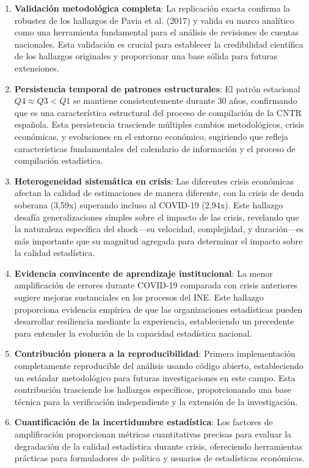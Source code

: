 \documentclass[12pt,a4paper]{article}
\begin{document}
\begin{enumerate}
\item \textbf{Validación metodológica completa}: La replicación exacta confirma la robustez de los hallazgos de Pavia et al. (2017) y valida su marco analítico como una herramienta fundamental para el análisis de revisiones de cuentas nacionales. Esta validación es crucial para establecer la credibilidad científica de los hallazgos originales y proporcionar una base sólida para futuras extensiones.

\item \textbf{Persistencia temporal de patrones estructurales}: El patrón estacional $Q4 \approx Q3 < Q1$ se mantiene consistentemente durante 30 años, confirmando que es una característica estructural del proceso de compilación de la CNTR española. Esta persistencia trasciende múltiples cambios metodológicos, crisis económicas, y evoluciones en el entorno económico, sugiriendo que refleja características fundamentales del calendario de información y el proceso de compilación estadística.

\item \textbf{Heterogeneidad sistemática en crisis}: Las diferentes crisis económicas afectan la calidad de estimaciones de manera diferente, con la crisis de deuda soberana (3,59x) superando incluso al COVID-19 (2,94x). Este hallazgo desafía generalizaciones simples sobre el impacto de las crisis, revelando que la naturaleza específica del shock—su velocidad, complejidad, y duración—es más importante que su magnitud agregada para determinar el impacto sobre la calidad estadística.

\item \textbf{Evidencia convincente de aprendizaje institucional}: La menor amplificación de errores durante COVID-19 comparada con crisis anteriores sugiere mejoras sustanciales en los procesos del INE. Este hallazgo proporciona evidencia empírica de que las organizaciones estadísticas pueden desarrollar resiliencia mediante la experiencia, estableciendo un precedente para entender la evolución de la capacidad estadística nacional.

\item \textbf{Contribución pionera a la reproducibilidad}: Primera implementación completamente reproducible del análisis usando código abierto, estableciendo un estándar metodológico para futuras investigaciones en este campo. Esta contribución trasciende los hallazgos específicos, proporcionando una base técnica para la verificación independiente y la extensión de la investigación.

\item \textbf{Cuantificación de la incertidumbre estadística}: Los factores de amplificación proporcionan métricas cuantitativas precisas para evaluar la degradación de la calidad estadística durante crisis, ofereciendo herramientas prácticas para formuladores de política y usuarios de estadísticas económicas.
\end{enumerate}
\end{document}
